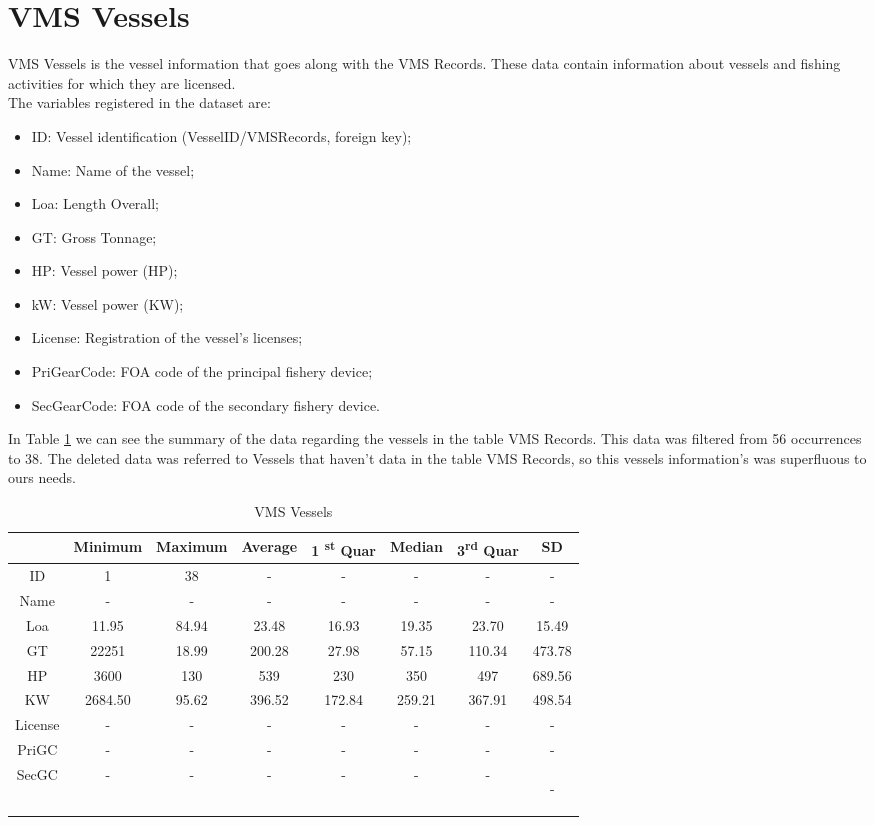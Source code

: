 \section{VMS Vessels} %
\label{sub:vms_vessels}
VMS Vessels is the vessel information that goes along with the VMS Records. These data contain information about vessels and fishing activities for which they are licensed.  \\
The variables registered in the dataset are:
\begin{itemize}
\item	ID: Vessel identification (VesselID/VMSRecords, foreign key);
\item	Name: Name of the vessel;
\item	Loa: Length Overall; 
\item	GT: Gross Tonnage;
\item	HP: Vessel power (HP);
\item	kW: Vessel power (KW);
\item	License: Registration of the vessel's licenses;
\item	PriGearCode: FOA code of the principal fishery device;
\item	SecGearCode: FOA code of the secondary fishery device.
\end{itemize}

In Table \ref{table:vms_vessels} we can see the summary of the data regarding the vessels in the table VMS Records. This data was filtered from 56 occurrences to 38. The deleted data was referred to Vessels that haven’t data in the table VMS Records, so this vessels information’s was superfluous to ours needs. 


\begin {table}[H]
\small
\begin{center}
\begin{tabular}{c|c|c|c|c|c|c|c}
            &  Minimum & Maximum & Average & 1 \textsuperscript{st} Quar & Median & 3\textsuperscript{rd} Quar & SD \\
\hline
ID     & 1&38&-&-&-&-&-\\
Name         &-&-&-&-&-&-&-\\
Loa         & 11.95&84.94&23.48&16.93&19.35&23.70&15.49\\
GT        &22251&18.99&200.28&27.98&57.15&110.34&473.78\\
HP        & 3600&130&539&230&350&497&689.56\\
KW        &2684.50&95.62&396.52&172.84&259.21&367.91&498.54\\
License        &-&-&-&-&-&-&-\\
PriGC       &-&-&-&-&-&-&-\\
SecGC        &-&-&-&-&-&-&-


           
\label{table:vms_vessels}
\end{tabular}
\caption {VMS Vessels}
\end{center}
\end {table}

